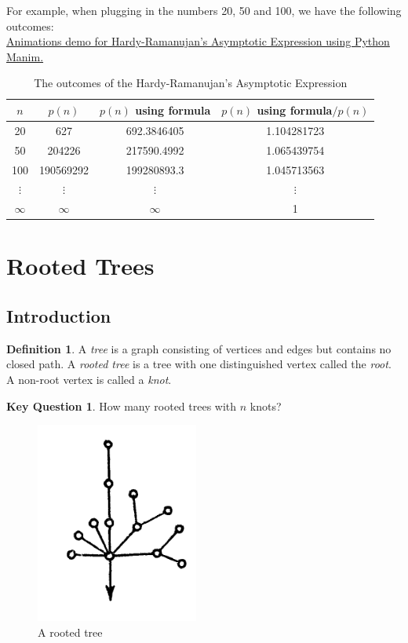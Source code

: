 \documentclass{article}
\theoremstyle{definition}
\newtheorem{definition}{Definition}[section]
\theoremstyle{question}
\newtheorem{question}{Key Question}[section]
\begin{document}
\noindent For example, when plugging in the numbers 20, 50 and 100, we have the following outcomes:\\

\noindent \href{https://youtu.be/UYjqhT5xnsY}{Animations demo for Hardy-Ramanujan’s Asymptotic Expression using Python Manim.}\cite{manim}


\begin{table}[h!] %
    \centering %
    \begin{tabular}{|c|c|c|c|}
        \hline
        $n$ & $p(n)$ & $p(n)$ using formula & $p(n)$ using formula$/p(n)$ \\
        \hline
        20 & 627 & 692.3846405 & 1.104281723 \\
        50 & 204226 & 217590.4992 & 1.065439754 \\
        100 & 190569292 & 199280893.3 & 1.045713563 \\
        $\vdots$ & $\vdots$ & $\vdots$ & $\vdots$ \\
        $\infty$ & $\infty$ & $\infty$ & 1 \\
        \hline
    \end{tabular}
    \caption{The outcomes of the Hardy-Ramanujan’s Asymptotic Expression} 
\end{table}

\newpage
    \section{Rooted Trees}
    \subsection{Introduction}
    \begin{definition}
                    A \emph{tree} is a graph consisting of vertices and edges 
            but contains no closed path. A \emph{rooted tree} is a tree with one distinguished vertex called the \emph{root}. A non-root vertex is called a \emph{knot}.
    \end{definition}

\begin{question}
    How many rooted trees with $n$ knots?
\end{question}
        \begin{figure}[h]
            \centering
            \includegraphics[scale=0.5]{images/rooted-tree.png}
            \caption{A rooted tree}
            \label{fig:enter-label}
        \end{figure}
\end{document}
